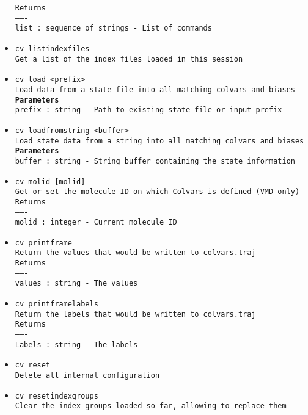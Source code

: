 \begin{itemize}
\texttt{Returns}
\\
\texttt{-------}
\\
\texttt{list : sequence of strings - List of commands}
\item \texttt{cv listindexfiles}
\\
\texttt{Get a list of the index files loaded in this session}
\item \texttt{cv load <prefix>}
\\
\texttt{Load data from a state file into all matching colvars and biases}
\\
\texttt{\textbf{Parameters}}
\\
\texttt{prefix : string - Path to existing state file or input prefix}
\item \texttt{cv loadfromstring <buffer>}
\\
\texttt{Load state data from a string into all matching colvars and biases}
\\
\texttt{\textbf{Parameters}}
\\
\texttt{buffer : string - String buffer containing the state information}
\item \texttt{cv molid [molid]}
\\
\texttt{Get or set the molecule ID on which Colvars is defined (VMD only)}
\\
\texttt{Returns}
\\
\texttt{-------}
\\
\texttt{molid : integer - Current molecule ID}
\item \texttt{cv printframe}
\\
\texttt{Return the values that would be written to colvars.traj}
\\
\texttt{Returns}
\\
\texttt{-------}
\\
\texttt{values : string - The values}
\item \texttt{cv printframelabels}
\\
\texttt{Return the labels that would be written to colvars.traj}
\\
\texttt{Returns}
\\
\texttt{-------}
\\
\texttt{Labels : string - The labels}
\item \texttt{cv reset}
\\
\texttt{Delete all internal configuration}
\item \texttt{cv resetindexgroups}
\\
\texttt{Clear the index groups loaded so far, allowing to replace them}

\end{itemize}
